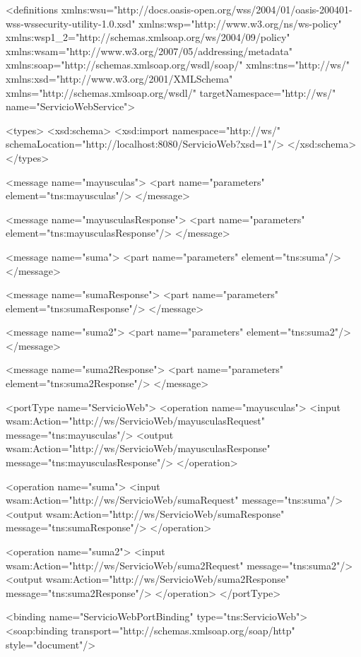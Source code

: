 \begin{SourceCode}
<definitions xmlns:wsu="http://docs.oasis-open.org/wss/2004/01/oasis-200401-wss-wssecurity-utility-1.0.xsd"
     xmlns:wsp="http://www.w3.org/ns/ws-policy"
     xmlns:wsp1_2="http://schemas.xmlsoap.org/ws/2004/09/policy"
     xmlns:wsam="http://www.w3.org/2007/05/addressing/metadata"
     xmlns:soap="http://schemas.xmlsoap.org/wsdl/soap/"
     xmlns:tns="http://ws/"
     xmlns:xsd="http://www.w3.org/2001/XMLSchema"
     xmlns="http://schemas.xmlsoap.org/wsdl/"
     targetNamespace="http://ws/"
     name="ServicioWebService">

<types>
<xsd:schema>
    <xsd:import namespace="http://ws/"
                schemaLocation="http://localhost:8080/ServicioWeb?xsd=1"/>
</xsd:schema>
</types>

<message name="mayusculas">
<part name="parameters" element="tns:mayusculas"/>
</message>

<message name="mayusculasResponse">
<part name="parameters" element="tns:mayusculasResponse"/>
</message>

<message name="suma">
<part name="parameters" element="tns:suma"/>
</message>

<message name="sumaResponse">
<part name="parameters" element="tns:sumaResponse"/>
</message>

<message name="suma2">
<part name="parameters" element="tns:suma2"/>
</message>

<message name="suma2Response">
<part name="parameters" element="tns:suma2Response"/>
</message>

<portType name="ServicioWeb">
<operation name="mayusculas">
    <input wsam:Action="http://ws/ServicioWeb/mayusculasRequest"
           message="tns:mayusculas"/>
    <output wsam:Action="http://ws/ServicioWeb/mayusculasResponse"
            message="tns:mayusculasResponse"/>
</operation>

<operation name="suma">
    <input wsam:Action="http://ws/ServicioWeb/sumaRequest"
           message="tns:suma"/>
    <output wsam:Action="http://ws/ServicioWeb/sumaResponse"
            message="tns:sumaResponse"/>
</operation>

<operation name="suma2">
    <input wsam:Action="http://ws/ServicioWeb/suma2Request"
           message="tns:suma2"/>
    <output wsam:Action="http://ws/ServicioWeb/suma2Response"
            message="tns:suma2Response"/>
</operation>
</portType>

<binding name="ServicioWebPortBinding" type="tns:ServicioWeb">
<soap:binding transport="http://schemas.xmlsoap.org/soap/http"
              style="document"/>


\end{SourceCode}
